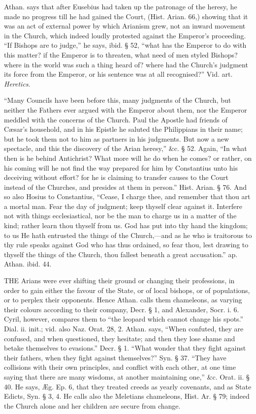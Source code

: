 Athan. says that after Eusebius had taken up the
patronage of the heresy, he made no progress till he had gained the
Court, (Hist. Arian. 66,) showing that it was an act of external power
by which Arianism grew, not an inward movement in the Church, which
indeed loudly protested against the Emperor's proceeding. ``If Bishops
are to judge,'' he says, ibid. § 52, ``what has the Emperor to do with
this matter? if the Emperor is to threaten, what need of men styled
Bishops? where in the world was such a thing heard of? where had the
Church's judgment its force from the Emperor, or his sentence was at
all recognised?'' Vid. art. \emph{Heretics}.

``Many Councils have been before this, many
judgments of the Church, but neither the Fathers ever argued with
the Emperor about them, nor the Emperor meddled with the concerns of
the Church. Paul the Apostle had friends of Cæsar's household, and in
his Epistle he saluted the Philippians in their name; but he took them
not to him as partners in his judgments. But now a new spectacle, and
this the discovery of the Arian heresy,'' \&c. § 52. Again, ``In
what then is he behind Antichrist? What more will he do when he comes?
or rather, on his coming will he not find the way prepared for him by
Constantius unto his deceiving without effort? for he is claiming to
transfer causes to the Court instead of the Churches, and presides at
them in person.'' Hist. Arian. § 76. And so also Hosius to Constantius,
``Cease, I charge thee, and remember that thou art a mortal man. Fear
the day of judgment; keep thyself clear against it. Interfere not with
things ecclesiastical, nor be the man to charge us in a matter of the
kind; rather learn thou thyself from us. God has put into thy hand the
kingdom; to us He hath entrusted the things of the Church,—and as he
who is traitorous to thy rule speaks against God who has thus
ordained, so fear thou, lest drawing to thyself the things of the
Church, thou fallest beneath a great accusation.'' ap. Athan. ibid. 44.


THE
Arians were ever shifting their ground or changing their professions,
in order to gain either the favour of the State, or of local bishops,
or of populations, or to perplex their opponents. Hence Athan. calls
them chameleons, as varying their colours according to their company,
Decr. § 1, and Alexander, Socr. i. 6. Cyril, however, compares them
to ``the leopard which cannot change his spots.'' Dial. ii. init.; vid.
also Naz. Orat. 28, 2. Athan. says, ``When confuted, they are confused,
and when questioned, they hesitate; and then they lose shame and
betake themselves to evasions.'' Decr. § 1. ``What wonder that they
fight against their fathers, when they fight against themselves?'' Syn.
§ 37. ``They have collisions with their own principles, and conflict
with each other, at one time saying that there are many wisdoms, at
another maintaining one,'' \&c. Orat. ii. § 40. He says, Æg. Ep.
6, that they treated creeds as yearly covenants, and as State Edicts,
Syn. § 3, 4. He calls also the Meletians chameleons, Hist. Ar. § 79;
indeed the Church alone and her children are secure from change.

